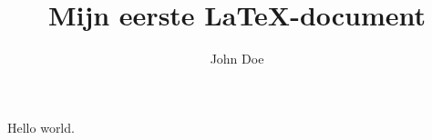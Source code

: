 \documentclass{article}
\author{John Doe}
\title{Mijn eerste \LaTeX-document}
\begin{document}
  \maketitle
  Hello world.
\end{document}
